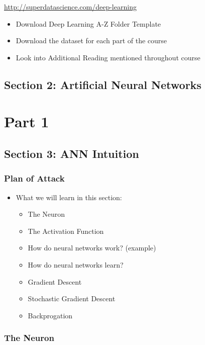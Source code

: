 \documentclass[11pt]{article}
\begin{document}
\url{http://superdatascience.com/deep-learning}

\begin{itemize}
\item Download Deep Learning A-Z Folder Template
\item Download the dataset for each part of the course
\item Look into Additional Reading mentioned throughout course
\end{itemize}

\subsection{Section 2: Artificial Neural Networks}
\label{sec:org6fd0ef0}

\section{Part 1}
\label{sec:org3e2cd51}

\subsection{Section 3: ANN Intuition}
\label{sec:org4e7f6bf}

\subsubsection{Plan of Attack}
\label{sec:orgf3b5624}
\begin{itemize}
\item What we will learn in this section:
\begin{itemize}
\item The Neuron
\item The Activation Function
\item How do neural networks work? (example)
\item How do neural networks learn?
\item Gradient Descent
\item Stochastic Gradient Descent
\item Backprogation
\end{itemize}
\end{itemize}

\subsubsection{The Neuron}
\label{sec:orgec9f4a2}
\end{document}
